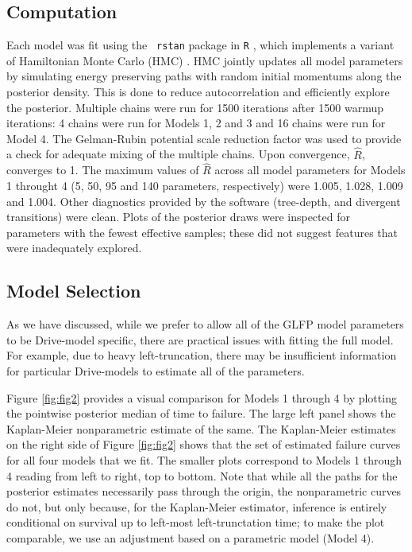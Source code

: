 \documentclass[12pt]{article}
\begin{document}
\subsection{Computation}
\label{sec:Computation}
Each model was fit using the {\tt
  rstan} \citep{rstan} package in {\tt R} \citep{r}, which implements a variant of Hamiltonian Monte Carlo (HMC)
\citep{betancourt}. HMC jointly updates all model parameters by simulating energy preserving paths with random initial momentums along the posterior density. This is done to reduce autocorrelation and efficiently explore the posterior. Multiple chains were run for 1500 iterations after 1500 warmup iterations: 4 chains were run for Models 1, 2 and 3 and 16 chains were run for Model 4. The Gelman-Rubin potential scale reduction factor was used to provide a check for adequate mixing of the multiple chains. Upon convergence, $\hat{R}$, converges to 1.  The  maximum values of $\hat{R}$ across all model parameters for Models 1 throught 4 (5, 50, 95 and 140 parameters, respectively) were 1.005, 1.028, 1.009 and 1.004. Other diagnostics provided by the software (tree-depth, and divergent transitions) were clean. Plots of the posterior draws were inspected for parameters with the fewest effective samples; these did not suggest features that were inadequately explored.




\subsection{Model Selection}
\label{sec:Model Comparisons}
As we have discussed, while we prefer to allow all of the GLFP model parameters to be Drive-model specific, there are practical issues with fitting the full model. For example, due to heavy left-truncation, there may be insufficient information for particular Drive-models to estimate all of the parameters. 

Figure \ref{fig:fig2} provides a visual comparison for Models 1 through 4 by plotting the pointwise posterior median of time to failure. The large left panel shows the Kaplan-Meier nonparametric estimate of the same. The Kaplan-Meier estimates on the right side of Figure \ref{fig:fig2} shows that the set of estimated failure curves for all four models that we fit. The smaller plots correspond to Models 1 through 4 reading from left to right, top to bottom. Note that while all the paths for the posterior estimates necessarily pass through the origin, the nonparametric curves do not, but only because, for the Kaplan-Meier estimator, inference is entirely conditional on survival up to left-most left-trunctation time; to make the plot comparable, we use an adjustment based on a parametric model (Model 4).
\end{document}
